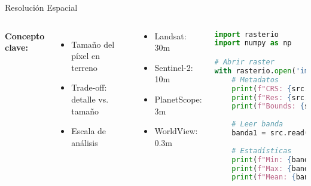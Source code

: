 \documentclass[10pt]{beamer}
\newcommand{\examplebox}[2]{
\begin{tcolorbox}[colframe=usachblue,colback=blue!5,title=#1]
#2
\end{tcolorbox}
}
\begin{document}
\begin{frame}[fragile]{Resolución Espacial}
    \begin{columns}
        \textbf{Concepto clave:}
        \begin{itemize}
            \item Tamaño del píxel en terreno
            \item Trade-off: detalle vs. tamaño
            \item Escala de análisis
        \end{itemize}
        
        \vspace{0.3cm}
        \examplebox{Resoluciones típicas}{
            \begin{itemize}
                \item Landsat: 30m
                \item Sentinel-2: 10m
                \item PlanetScope: 3m
                \item WorldView: 0.3m
            \end{itemize}
        }
        
        \begin{lstlisting}[language=Python, caption=Trabajando con rasters]
import rasterio
import numpy as np

# Abrir raster
with rasterio.open('imagen.tif') as src:
    # Metadatos
    print(f"CRS: {src.crs}")
    print(f"Res: {src.res}")
    print(f"Bounds: {src.bounds}")
    
    # Leer banda
    banda1 = src.read(1)
    
    # Estadísticas
    print(f"Min: {banda1.min()}")
    print(f"Max: {banda1.max()}")
    print(f"Mean: {banda1.mean()}")
        \end{lstlisting}
    \end{columns}
\end{frame}
\end{document}
